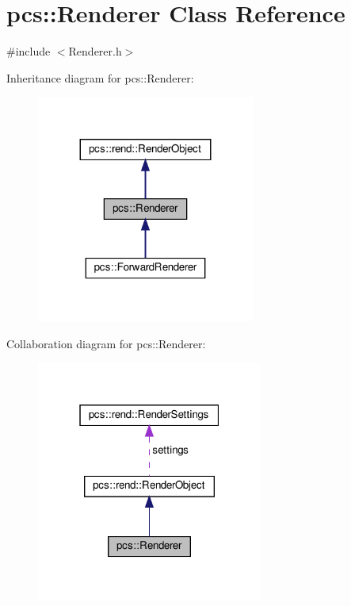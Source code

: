 \hypertarget{classpcs_1_1Renderer}{}\section{pcs\+:\+:Renderer Class Reference}
\label{classpcs_1_1Renderer}


{\ttfamily \#include $<$Renderer.\+h$>$}



Inheritance diagram for pcs\+:\+:Renderer\+:\nopagebreak
\begin{figure}[H]
\begin{center}
\leavevmode
\includegraphics[width=203pt]{classpcs_1_1Renderer__inherit__graph}
\end{center}
\end{figure}


Collaboration diagram for pcs\+:\+:Renderer\+:\nopagebreak
\begin{figure}[H]
\begin{center}
\leavevmode
\includegraphics[width=211pt]{classpcs_1_1Renderer__coll__graph}
\end{center}
\end{figure}
